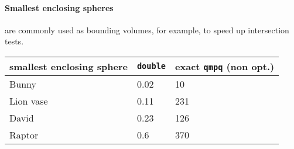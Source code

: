 
\paragraph{Smallest enclosing spheres} are commonly used as bounding
volumes, for example, to speed up intersection tests.

\begin{tabular}{l|ll}
  \textbf{smallest enclosing sphere} & \texttt{double} & exact
    \texttt{qmpq} (non opt.)\\\hline
  Bunny     & 0.02 &  10 \\
  Lion vase & 0.11 & 231 \\
  David     & 0.23 & 126 \\
  Raptor    & 0.6  & 370
\end{tabular}
